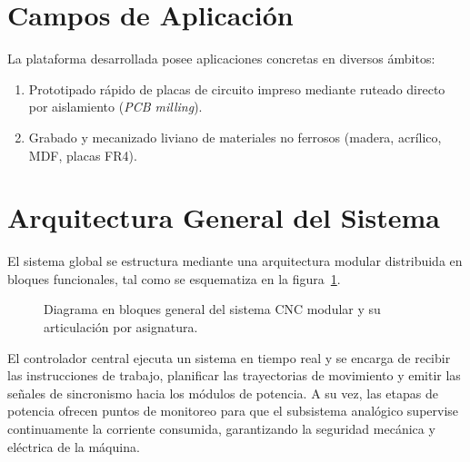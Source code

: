 \section{Campos de Aplicación}
\label{sec:aplicacion}

La plataforma desarrollada posee aplicaciones concretas en diversos ámbitos:
\begin{enumerate}
  \item Prototipado rápido de placas de circuito impreso mediante ruteado directo por aislamiento (\textit{PCB milling}).
  \item Grabado y mecanizado liviano de materiales no ferrosos (madera, acrílico, MDF, placas FR4).
\end{enumerate}

\section{Arquitectura General del Sistema}
\label{sec:bloques_general}

El sistema global se estructura mediante una arquitectura modular distribuida en bloques funcionales, tal como se
esquematiza en la figura~\ref{fig.ej1:bloques_general}.

\begin{figure}[!ht]
  \centering
  \resizebox{0.92\linewidth}{!}{}
  \caption{Diagrama en bloques general del sistema CNC modular y su articulación por asignatura.}
  \label{fig.ej1:bloques_general}
\end{figure}

El controlador central ejecuta un sistema en tiempo real y se encarga de recibir las instrucciones de trabajo,
planificar las trayectorias de movimiento y emitir las señales de sincronismo hacia los módulos de potencia. A su vez,
las etapas de potencia ofrecen puntos de monitoreo para que el subsistema analógico supervise continuamente la
corriente consumida, garantizando la seguridad mecánica y eléctrica de la máquina.
